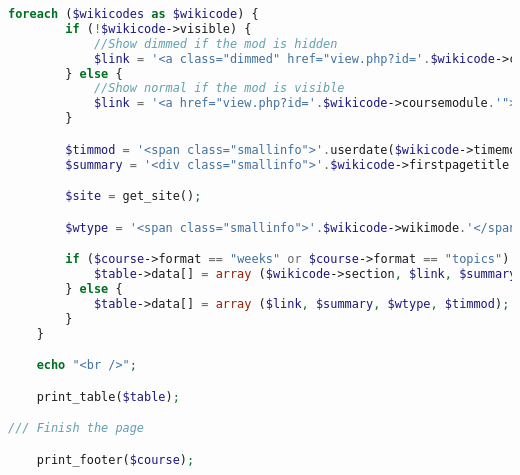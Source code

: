 \begin{lstlisting}[language=PHP]
    foreach ($wikicodes as $wikicode) {
        if (!$wikicode->visible) {
            //Show dimmed if the mod is hidden
            $link = '<a class="dimmed" href="view.php?id='.$wikicode->coursemodule.'">'.format_string($wikicode->name,true).'</a>';
        } else {
            //Show normal if the mod is visible
            $link = '<a href="view.php?id='.$wikicode->coursemodule.'">'.format_string($wikicode->name,true).'</a>';
        }

        $timmod = '<span class="smallinfo">'.userdate($wikicode->timemodified).'</span>';
        $summary = '<div class="smallinfo">'.$wikicode->firstpagetitle.'</div>';

        $site = get_site();

        $wtype = '<span class="smallinfo">'.$wikicode->wikimode.'</span>';

        if ($course->format == "weeks" or $course->format == "topics") {
            $table->data[] = array ($wikicode->section, $link, $summary, $wtype, $timmod);
        } else {
            $table->data[] = array ($link, $summary, $wtype, $timmod);
        }
    }

    echo "<br />";

    print_table($table);

/// Finish the page

    print_footer($course);
\end{lstlisting}

